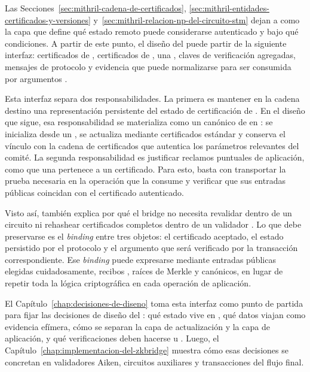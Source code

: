 
Las Secciones~\ref{sec:mithril-cadena-de-certificados}, \ref{sec:mithril-entidades-certificados-y-versiones} y~\ref{sec:mithril-relacion-np-del-circuito-stm} dejan a \Mithril como la capa que define qué estado remoto puede considerarse autenticado y bajo qué condiciones. A partir de este punto, el diseño del \zkBridge puede partir de la siguiente interfaz: certificados de \StakeDistribution, certificados de \TransactionSnapshot, una \CertificateChain, claves de verificación agregadas, mensajes de protocolo y evidencia que puede normalizarse para ser consumida por argumentos \ZK.

Esta interfaz separa dos responsabilidades. La primera es mantener en la cadena destino una representación persistente del estado de certificación de \Mithril. En el diseño que sigue, esa responsabilidad se materializa como un \UTxO canónico de \StakeDistribution en \ChainB: se inicializa desde un \GenesisCertificate, se actualiza mediante certificados estándar y conserva el vínculo con la cadena de certificados que autentica los parámetros relevantes del comité. La segunda responsabilidad es justificar reclamos puntuales de aplicación, como que una \LockTx pertenece a un \TransactionSnapshot certificado. Para esto, basta con transportar la prueba necesaria en la operación que la consume y verificar que sus entradas públicas coincidan con el certificado autenticado.

Visto así, \Mithril también explica por qué el bridge no necesita revalidar \Praos dentro de un circuito ni rehashear certificados completos dentro de un validador \Onchain. Lo que debe preservarse es el \textit{binding} entre tres objetos: el certificado aceptado, el estado persistido por el protocolo y el argumento \ZK que será verificado por la transacción correspondiente. Ese \textit{binding} puede expresarse mediante entradas públicas elegidas cuidadosamente, recibos \ProofReceipt, raíces de Merkle y \UTxOs canónicos, en lugar de repetir toda la lógica criptográfica en cada operación de aplicación.

El Capítulo~\ref{chap:decisiones-de-diseno} toma esta interfaz como punto de partida para fijar las decisiones de diseño del \zkBridge: qué estado vive en \ChainB, qué datos viajan como evidencia efímera, cómo se separan la capa de actualización y la capa de aplicación, y qué verificaciones deben hacerse \Onchain u \Offchain. Luego, el Capítulo~\ref{chap:implementacion-del-zkbridge} muestra cómo esas decisiones se concretan en validadores Aiken, circuitos auxiliares y transacciones del flujo final.
